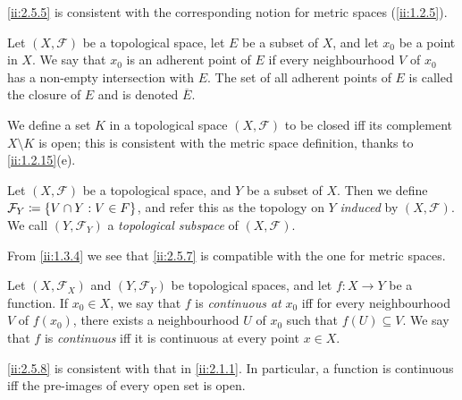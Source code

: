 \begin{note}
  \cref{ii:2.5.5} is consistent with the corresponding notion for metric spaces (\cref{ii:1.2.5}).
\end{note}

\begin{defn}[Closure]\label{ii:2.5.6}
  Let \((X, \mathcal{F})\) be a topological space, let \(E\) be a subset of \(X\), and let \(x_0\) be a point in \(X\).
  We say that \(x_0\) is an adherent point of \(E\) if every neighbourhood \(V\) of \(x_0\) has a non-empty intersection with \(E\).
  The set of all adherent points of \(E\) is called the closure of \(E\) and is denoted \(\overline{E}\).
\end{defn}

\begin{note}
  We define a set \(K\) in a topological space \((X, \mathcal{F})\) to be closed iff its complement \(X \setminus K\) is open;
  this is consistent with the metric space definition, thanks to \cref{ii:1.2.15}(e).
\end{note}

\begin{defn}\label{ii:2.5.7}
  Let \((X, \mathcal{F})\) be a topological space, and \(Y\) be a subset of \(X\).
  Then we define \(\mathcal{F}_Y \coloneqq \left\lbrace V \cap Y : V \in F\right\rbrace\), and refer this as the topology on \(Y\) \emph{induced} by \((X, \mathcal{F})\).
  We call \((Y, \mathcal{F}_Y)\) a \emph{topological subspace} of \((X, \mathcal{F})\).
\end{defn}

\begin{note}
  From \cref{ii:1.3.4} we see that \cref{ii:2.5.7} is compatible with the one for metric spaces.
\end{note}

\begin{defn}\label{ii:2.5.8}
  Let \((X, \mathcal{F}_X)\) and \((Y, \mathcal{F}_Y)\) be topological spaces, and let \(f : X \to Y\) be a function.
  If \(x_0 \in X\), we say that \(f\) is \emph{continuous at} \(x_0\) iff for every neighbourhood \(V\) of \(f(x_0)\), there exists a neighbourhood \(U\) of \(x_0\) such that \(f(U) \subseteq V\).
  We say that \(f\) is \emph{continuous} iff it is continuous at every point \(x \in X\).
\end{defn}

\begin{note}
  \cref{ii:2.5.8} is consistent with that in \cref{ii:2.1.1}.
  In particular, a function is continuous iff the pre-images of every open set is open.
\end{note}

